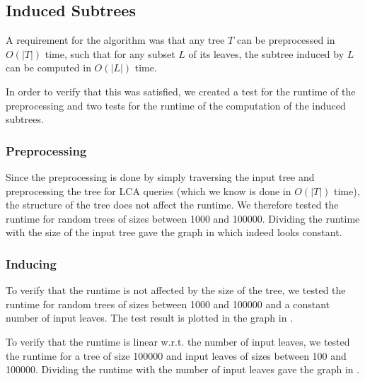 
\subsection{Induced Subtrees}
A requirement for the algorithm was that any tree $T$ can be preprocessed in $O(|T|)$ time, such that for any subset $L$ of its leaves, the subtree induced by $L$ can be computed in $O(|L|)$ time.

In order to verify that this was satisfied, we created a test for the runtime of the preprocessing and two tests for the runtime of the computation of the induced subtrees.

\subsubsection{Preprocessing}
Since the preprocessing is done by simply traversing the input tree and preprocessing the tree for LCA queries (which we know is done in $O(|T|)$ time), the structure of the tree does not affect the runtime. We therefore tested the runtime for random trees of sizes between 1000 and 100000. Dividing the runtime with the size of the input tree gave the graph in  which indeed looks constant.

\subsubsection{Inducing}
To verify that the runtime is not affected by the size of the tree, we tested the runtime for random trees of sizes between 1000 and 100000 and a constant number of input leaves. The test result is plotted in the graph in .

To verify that the runtime is linear w.r.t. the number of input leaves, we tested the runtime for a tree of size 100000 and input leaves of sizes between 100 and 100000. Dividing the runtime with the number of input leaves gave the graph in .



